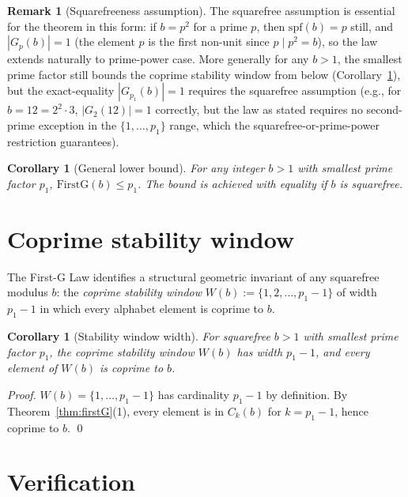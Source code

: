 \documentclass[11pt,reqno]{amsart}
\theoremstyle{plain}
\newtheorem{corollary}[theorem]{Corollary}
\theoremstyle{definition}
\newtheorem{remark}[theorem]{Remark}
\begin{document}
\begin{remark}[Squarefreeness assumption]
The squarefree assumption is essential for the theorem in this
form: if $b = p^2$ for a prime $p$, then $\mathrm{spf}(b) = p$
still, and $|G_p(b)| = 1$ (the element $p$ is the first non-unit
since $p \mid p^2 = b$), so the law extends naturally to
prime-power case. More generally for any $b > 1$, the smallest
prime factor still bounds the coprime stability window from
below (Corollary~\ref{cor:general}), but the exact-equality
$|G_{p_1}(b)| = 1$ requires the squarefree assumption (e.g., for
$b = 12 = 2^2 \cdot 3$, $|G_2(12)| = 1$ correctly, but the
law as stated requires no second-prime exception in the
$\{1, \ldots, p_1\}$ range, which the squarefree-or-prime-power
restriction guarantees).
\end{remark}

\begin{corollary}[General lower bound]\label{cor:general}
For any integer $b > 1$ with smallest prime factor $p_1$,
$\mathrm{FirstG}(b) \leq p_1$. The bound is achieved with
equality if $b$ is squarefree.
\end{corollary}

\section{Coprime stability window}

The First-G Law identifies a structural geometric invariant of any
squarefree modulus $b$: the \emph{coprime stability window}
$W(b) := \{1, 2, \ldots, p_1 - 1\}$ of width $p_1 - 1$ in which
every alphabet element is coprime to $b$.

\begin{corollary}[Stability window width]\label{cor:width}
For squarefree $b > 1$ with smallest prime factor $p_1$, the
coprime stability window $W(b)$ has width $p_1 - 1$, and every
element of $W(b)$ is coprime to $b$.
\end{corollary}

\begin{proof}
$W(b) = \{1, \ldots, p_1 - 1\}$ has cardinality $p_1 - 1$ by
definition. By Theorem~\ref{thm:firstG}(1), every element is in
$C_k(b)$ for $k = p_1 - 1$, hence coprime to $b$. \qed
\end{proof}

\section{Verification}
\end{document}
